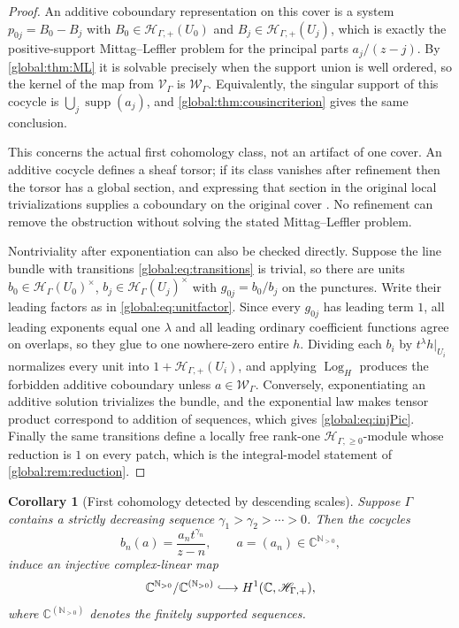 \documentclass[11pt,letterpaper]{article}
\newtheorem{corollary}[corollary]{Corollary}
\theoremstyle{definition}
\theoremstyle{remark}
\newcommand{\C}{\mathbb C}
\newcommand{\N}{\mathbb N}
\newcommand{\HH}{\mathscr H_\Gamma}
\newcommand{\HP}{\mathscr H_{\Gamma,+}}
\newcommand{\HI}{\mathscr H_{\Gamma,\ge0}}
\newcommand{\supp}{\operatorname{supp}}
\newcommand{\LogH}{\operatorname{Log}_{H}}
\numberwithin{equation}{section}
\begin{document}
\begin{proof}
An additive coboundary representation on this cover is a system $p_{0j}=B_0-B_j$ with $B_0\in\HP(U_0)$ and $B_j\in\HP(U_j)$, which is exactly the positive-support Mittag--Leffler problem for the principal parts $a_j/(z-j)$. By \cref{global:thm:ML} it is solvable precisely when the support union is well ordered, so the kernel of the map from $\mathcal V_\Gamma$ is $\mathcal W_\Gamma$. Equivalently, the singular support of this cocycle is $\bigcup_j\supp(a_j)$, and \cref{global:thm:cousincriterion} gives the same conclusion.

This concerns the actual first cohomology class, not an artifact of one cover. An additive cocycle defines a sheaf torsor; if its class vanishes after refinement then the torsor has a global section, and expressing that section in the original local trivializations supplies a coboundary on the original cover \cite[Tag~02FQ]{Stacks}. No refinement can remove the obstruction without solving the stated Mittag--Leffler problem.

Nontriviality after exponentiation can also be checked directly. Suppose the line bundle with transitions \eqref{global:eq:transitions} is trivial, so there are units $b_0\in\HH(U_0)^\times$, $b_j\in\HH(U_j)^\times$ with $g_{0j}=b_0/b_j$ on the punctures. Write their leading factors as in \eqref{global:eq:unitfactor}. Since every $g_{0j}$ has leading term $1$, all leading exponents equal one $\lambda$ and all leading ordinary coefficient functions agree on overlaps, so they glue to one nowhere-zero entire $h$. Dividing each $b_i$ by $t^\lambda h|_{U_i}$ normalizes every unit into $1+\HP(U_i)$, and applying $\LogH$ produces the forbidden additive coboundary unless $a\in\mathcal W_\Gamma$. Conversely, exponentiating an additive solution trivializes the bundle, and the exponential law makes tensor product correspond to addition of sequences, which gives \eqref{global:eq:injPic}. Finally the same transitions define a locally free rank-one $\HI$-module whose reduction is $1$ on every patch, which is the integral-model statement of \cref{global:rem:reduction}.
\end{proof}

\begin{corollary}[First cohomology detected by descending scales]\label{global:cor:H1injection}
Suppose $\Gamma$ contains a strictly decreasing sequence $\gamma_1>\gamma_2>\cdots>0$. Then the cocycles
\begin{equation}\label{global:eq:obstructioncocycle}
  b_n(a)=\frac{a_nt^{\gamma_n}}{z-n},
  \qquad a=(a_n)\in\C^{\N_{>0}},
\end{equation}
induce an injective complex-linear map
\begin{equation}\label{global:eq:cohomologyinjection}
  \C^{\N_{>0}}/\C^{(\N_{>0})}
  \lhook\joinrel\longrightarrow H^1(\C,\HP),
\end{equation}
where $\C^{(\N_{>0})}$ denotes the finitely supported sequences.
\end{corollary}
\end{document}

